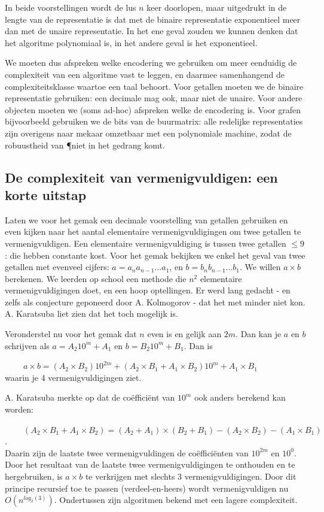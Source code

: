 In beide voorstellingen wordt de lus $n$ keer doorlopen, maar uitgedrukt
in de lengte van de representatie is dat met de binaire representatie
exponentieel meer dan met de unaire representatie. In het ene geval
zouden we kunnen denken dat het algoritme polynomiaal is, in het andere
geval is het exponentieel.

We moeten dus afspreken welke encodering we gebruiken om meer
eenduidig de complexiteit van een algoritme vast te leggen, en daarmee
samenhangend de complexiteitsklasse waartoe een taal behoort. Voor
getallen moeten we de binaire representatie gebruiken: een decimale
mag ook, maar niet de unaire. Voor andere objecten moeten we (soms
ad-hoc) afspreken welke de encodering is. Voor grafen bijvoorbeeld
gebruiken we de bits van de buurmatrix: alle redelijke representaties
zijn overigens naar mekaar omzetbaar met een polynomiale machine,
zodat de robuustheid van \P niet in het gedrang komt.

\subsection{De complexiteit van vermenigvuldigen: een korte uitstap}

Laten we voor het gemak een decimale voorstelling van getallen
gebruiken en even kijken naar het aantal elementaire
vermenigvuldigingen om twee getallen te vermenigvuldigen. Een
elementaire vermenigvuldiging is tussen twee getallen $\leq 9$: die
hebben constante kost. Voor het gemak bekijken we enkel het geval van
twee getallen met evenveel cijfers: $a = a_na_{n-1}...a_1$, en 
$b = b_nb_{n-1}...b_1$. We willen $a \times b$ berekenen. We leerden
op school een methode die $n^2$ elementaire vermenigvuldigingen doet,
en een hoop optellingen. Er werd lang gedacht - en zelfs als
conjecture geponeerd door A. Kolmogorov - dat het met minder niet
kon. A. Karatsuba liet zien dat het toch mogelijk is.

Veronderstel nu voor het gemak dat $n$ even is en gelijk aan $2m$. Dan
kan je $a$ en $b$ schrijven als
%
$a = A_{2}10^m + A_1$ en $b = B_{2}10^m + B_1$.
%
Dan is 

$~~~~~~~~~~a \times b = (A_{2}\times B_{2})10^{2m} + (A_{2}\times B_1 + A_1\times B_{2})10^m + A_1\times B_1 $ \\
waarin je 4 vermenigvuldigingen ziet.

A. Karatsuba merkte op dat de co\"effici\"ent van $10^m$ ook anders
berekend kan worden:

$~~~~~~~~~~(A_{2}\times B_1 + A_1\times B_{2}) = (A_{2} + A_1) \times (B_{2} +
B_1) - (A_{2}\times B_{2}) - (A_1\times B_1)$. \\
Daarin zijn de laatste twee vermenigvuldingen de co\"effici\"enten van
$10^{2m}$ en $10^0$. Door het resultaat van de laatste twee
vermenigvuldigingen te onthouden en te hergebruiken, is $a \times b$
te verkrijgen met slechts 3 vermenigvuldigingen. Door dit principe
recursief toe te passen (verdeel-en-heers) wordt vermenigvuldigen nu
$O(n^{log_2(3)})$. Ondertussen zijn algoritmen bekend met een lagere
complexiteit.

